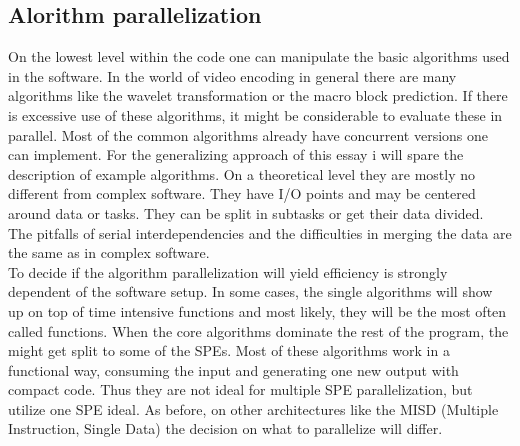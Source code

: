 \subsection{Alorithm parallelization}
On the lowest level within the code one can manipulate the basic algorithms used in the software. In the world of video encoding in general there are many algorithms like the wavelet transformation or the macro block prediction. If there is excessive use of these algorithms, it might be considerable to evaluate these in parallel. Most of the common algorithms already have concurrent versions one can implement. For the generalizing approach of this essay i will spare the description of example algorithms. On a theoretical level they are mostly no different from complex software. They have I/O points and may be centered around data or tasks. They can be split in subtasks or get their data divided. The pitfalls of serial interdependencies and the difficulties in merging the data are the same as in complex software.\\
To decide if the algorithm parallelization will yield efficiency is strongly dependent of the software setup. In some cases, the single algorithms will show up on top of time intensive functions and most likely, they will be the most often called functions. When the core algorithms dominate the rest of the program, the might get split to some of the SPEs. Most of these algorithms work in a functional way, consuming the input and generating one new output with compact code. Thus they are not ideal for multiple SPE parallelization, but utilize one SPE ideal. As before, on other architectures like the MISD (Multiple Instruction, Single Data) the decision on what to parallelize will differ.
